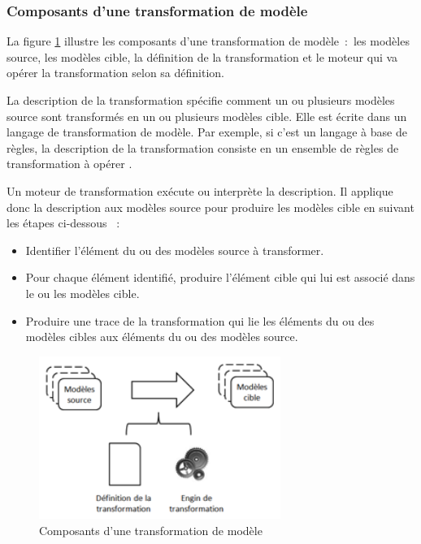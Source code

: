 \subsubsection{Composants d'une transformation de modèle} 
La figure \ref{fig:composantTransfo} illustre les composants d'une 
transformation de modèle~:~les modèles source, les modèles cible, la définition 
de la transformation et le moteur qui va opérer la transformation selon sa 
définition. 

La description de la transformation spécifie comment un ou plusieurs modèles 
source sont transformés en un ou plusieurs modèles cible. Elle est écrite dans 
un langage de transformation de modèle. Par exemple, si c'est un langage à base 
de règles, la description de la transformation consiste en un ensemble de règles 
de transformation à opérer \cite{kleppe2003mda}. 

Un moteur de transformation exécute ou interprète la description. Il applique 
donc la description aux modèles source pour produire les modèles cible en 
suivant les étapes ci-dessous \cite{tratt2005model}~:

\begin{itemize}
\item Identifier l'élément du ou des modèles source à transformer.
\item Pour chaque élément identifié, produire l'élément cible qui lui est 
associé dans le ou les modèles cible.
\item Produire une trace de la transformation qui lie les éléments du ou des 
modèles cibles aux éléments du ou des modèles source.
\end{itemize}

\begin{figure}[!htbp]
 \begin{center}
   \includegraphics[width=0.7\textwidth]{images/Chapitre1/composanttransfo.png}
 \end{center}
 \caption{Composants d'une transformation de modèle}
 \label{fig:composantTransfo}
\end{figure}

